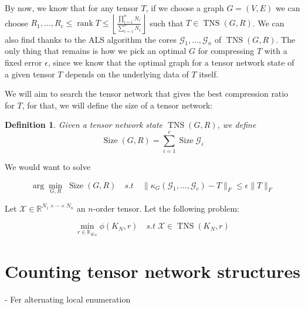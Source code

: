 \documentclass[11pt,a4paper,openright,oneside]{book}
\numberwithin{equation}{section}
\newtheorem{defn0}{Definition}[chapter]
\newenvironment{definition}{ \begin{defn0}}{\end{defn0}}
\DeclareMathOperator{\rank}{rank}
\DeclareMathOperator{\TNS}{TNS}
\DeclareMathOperator{\size}{Size}
\begin{document}
By now, we know that for any tensor $T$, if we choose a graph $G = (V, E)$ we can choose 
$R_1, \dots, R_c \leqslant \rank{T} \leqslant \left\lfloor \frac{\prod_{i=1}^n N_i}{\sum_{i=1}^n N_i} \right\rfloor$
such that $T \in \TNS(G, R)$. We can also find thanks to the ALS algorithm the cores $\mathcal{G}_1, \dots, \mathcal{G}_n$ of 
$\TNS(G, R)$. The only thing that remains is how we pick an optimal $G$ for compressing $T$ with a fixed error $\epsilon$, since we know that
the optimal graph for a tensor network state of a given tensor $T$ depends on the underlying data of $T$ itself.

We will aim to search the tensor network that gives the best compression ratio for $T$, for that, we will define the size 
of a tensor network:

\begin{definition}
    \cite{guoTensorNetworkStructure2025}
    Given a tensor network state $\TNS(G, R)$, we define $$\size(G, R) = \sum_{i=1}^c \size\mathcal{G}_i$$
\end{definition}

We would want to solve

$$\arg\min_{G, R} \;\size(G, R) \quad s.t \quad \|\kappa_G(\mathcal{G}_1, \dots, \mathcal{G}_c) - T\|_F \leqslant \epsilon \|T\|_F$$




Let $\mathcal{X} \in \mathbb{R}^{N_1 \times \cdots \times N_n}$ an $n$-order tensor. Let the following problem:

$$ \min_{r \in \mathbb{K}_{K_N} } \phi(K_N, r) \quad s.t\; \mathcal{X} \in \TNS{(K_N, r)} $$ 

\section{Counting tensor network structures}

- Fer alternating local enumeration


\end{document}
